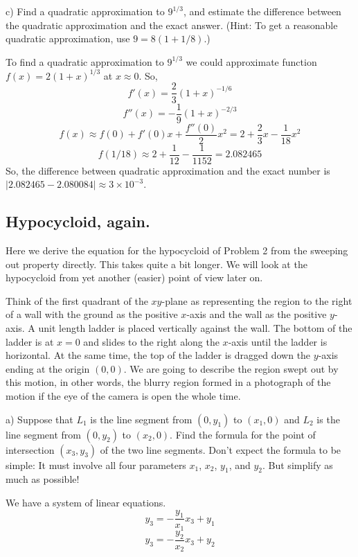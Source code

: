 \documentclass{article}
\begin{document}
\begin{tcolorbox}
    c) Find a quadratic approximation to $9^{1/3}$, and estimate the difference between the quadratic approximation and the exact answer. (Hint: To get a reasonable quadratic approximation, use $9 = 8(1 + 1/8)$.)
\end{tcolorbox}
To find a quadratic approximation to $9^{1/3}$ we could approximate function $f(x) = 2(1+x)^{1/3}$ at $x \approx 0$. So,
\[ f'(x) = \frac{2}{3}(1+x)^{-1/6} \]
\[ f''(x) = -\frac{1}{9}(1+x)^{-2/3} \]
\[ f(x) \approx f(0) + f'(0)x + \frac{f''(0)}{2}x^2 = 2 + \frac{2}{3}x - \frac{1}{18}x^2\]
\[ f(1/18) \approx 2 + \frac{1}{12} - \frac{1}{1152} = 2.082465 \]
So, the difference between quadratic approximation and the exact number is $|2.082465 - 2.080084| \approx 3 \times 10^{-3}$.

\newpage
\subsection{Hypocycloid, again.}
\begin{tcolorbox}
    Here we derive the equation for the hypocycloid of Problem 2 from the sweeping out property directly. This takes quite a bit longer. We will look at the hypocycloid from yet another (easier) point of view later on.
    \\ \par Think of the first quadrant of the $xy$-plane as representing the region to the right of a wall with the ground as the positive $x$-axis and the wall as the positive $y$-axis. A unit length ladder is placed vertically against the wall. The bottom of the ladder is at $x = 0$ and slides to the right along the $x$-axis until the ladder is horizontal. At the same time, the top of the ladder is dragged down the $y$-axis ending at the origin $(0, 0)$. We are going to describe the region swept out by this motion, in other words, the blurry region formed in a photograph of the motion if the eye of the camera is open the whole time. 
    \\ \par a) Suppose that $L_1$ is the line segment from $(0, y_1)$ to $(x_1, 0)$ and $L_2$ is the line segment from $(0, y_2)$ to $(x_2, 0)$. Find the formula for the point of intersection $(x_3, y_3)$ of the two line segments. Don’t expect the formula to be simple: It must involve all four parameters $x_1$, $x_2$, $y_1$, and $y_2$. But simplify as much as possible!
\end{tcolorbox}
\begin{figure}[htp!]
    \centering
    
    \label{fig:fig12}
\end{figure}
\newpage
We have a system of linear equations.
\[ y_3 = -\frac{y_1}{x_1}x_3 + y_1 \]
\[ y_3 = -\frac{y_2}{x_2}x_3 + y_2 \]
\end{document}

